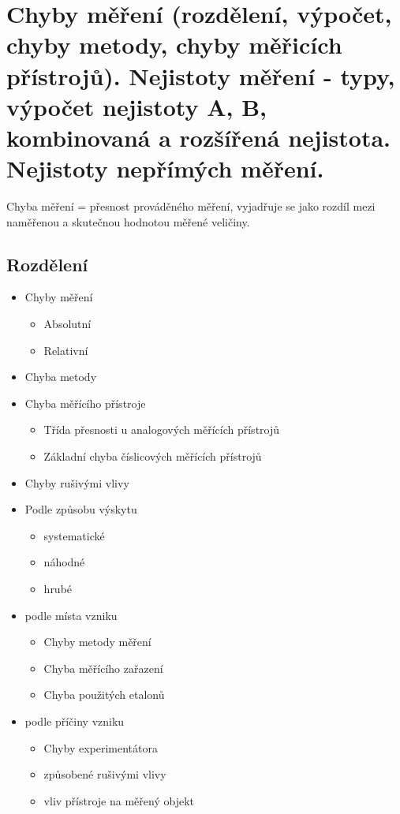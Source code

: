 \section{Chyby měření (rozdělení, výpočet, chyby metody, chyby měřicích přístrojů). Nejistoty měření - typy, výpočet nejistoty A, B, kombinovaná a rozšířená nejistota. Nejistoty nepřímých měření.}
Chyba měření = přesnost prováděného měření, vyjadřuje se jako rozdíl mezi
naměřenou a skutečnou hodnotou měřené veličiny.
\subsection*{Rozdělení}
\begin{itemize}
    \item Chyby měření
          \begin{itemize}
              \item Absolutní
              \item Relativní
          \end{itemize}
    \item Chyba metody
    \item Chyba měřícího přístroje
          \begin{itemize}
              \item Třída přesnosti u analogových měřících přístrojů
              \item Základní chyba číslicových měřících přístrojů
          \end{itemize}
    \item Chyby rušivými vlivy
    \item Podle způsobu výskytu
          \begin{itemize}
              \item systematické
              \item náhodné
              \item hrubé
          \end{itemize}
    \item podle místa vzniku
          \begin{itemize}
              \item Chyby metody měření
              \item Chyba měřícího zařazení
              \item Chyba použitých etalonů
          \end{itemize}
    \item podle příčiny vzniku
          \begin{itemize}
              \item Chyby experimentátora
              \item způsobené rušivými vlivy
              \item vliv přístroje na měřený objekt
          \end{itemize}
\end{itemize}
